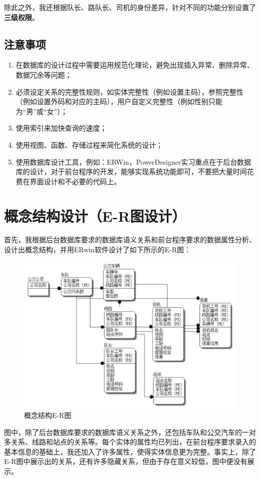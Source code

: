\documentclass {article}
\begin{document}
			除此之外，我还根据队长、路队长、司机的身份差异，针对不同的功能分别设置了\textbf{三级权限}。
			
		\subsection{注意事项}
			\begin{enumerate}
				\item 在数据库的设计过程中需要运用规范化理论，避免出现插入异常、删除异常、数据冗余等问题；
				\item 必须设定关系的完整性规则，如实体完整性（例如设置主码），参照完整性（例如设置外码和对应的主码），用户自定义完整性（例如性别只能为“男”或“女”）；
				\item 使用索引来加快查询的速度；
				\item 使用视图、函数、存储过程来简化系统的设计；
				\item 使用数据库设计工具，例如：ERWin，PowerDesigner实习重点在于后台数据库的设计，对于前台程序的开发，能够实现系统功能即可，不要把大量时间花费在界面设计和不必要的代码上。
			\end{enumerate}
		
	\section{概念结构设计（E-R图设计）}
		首先，我根据后台数据库要求的数据库语义关系和前台程序要求的数据属性分析、设计出概念结构，并用ERwin软件设计了如下所示的E-R图：
		\begin{figure}[H]
			\centering
			\includegraphics[width=4.5in]{figures/fig1.png}
			\caption{概念结构E-R图}
		\end{figure}
	
		图中，除了后台数据库要求的数据库语义关系之外，还包括车队和公交汽车的一对多关系、线路和站点的关系等。每个实体的属性均已列出，在前台程序要求录入的基本信息的基础上，我还加入了许多属性，使得实体信息更为完整。事实上，除了E-R图中展示出的关系，还有许多隐藏关系，但由于存在意义较低，图中便没有展示。
	
\end{document}
